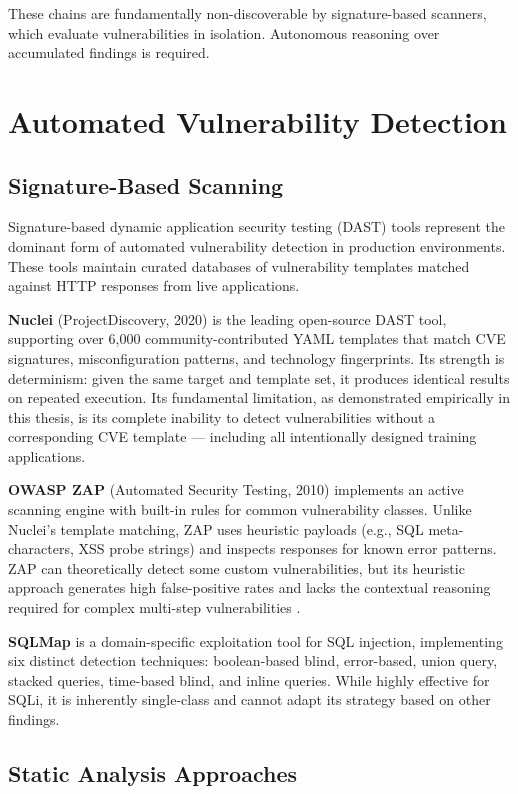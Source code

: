 \documentclass[12pt,a4paper,oneside,openany]{book}
\begin{document}
These chains are fundamentally non-discoverable by signature-based scanners, which evaluate vulnerabilities in isolation. Autonomous reasoning over accumulated findings is required.

\section{Automated Vulnerability Detection}

\subsection{Signature-Based Scanning}

Signature-based dynamic application security testing (DAST) tools represent the dominant form of automated vulnerability detection in production environments. These tools maintain curated databases of vulnerability templates matched against HTTP responses from live applications.

\textbf{Nuclei} (ProjectDiscovery, 2020) is the leading open-source DAST tool, supporting over 6,000 community-contributed YAML templates that match CVE signatures, misconfiguration patterns, and technology fingerprints. Its strength is determinism: given the same target and template set, it produces identical results on repeated execution. Its fundamental limitation, as demonstrated empirically in this thesis, is its complete inability to detect vulnerabilities without a corresponding CVE template — including all intentionally designed training applications.

\textbf{OWASP ZAP} (Automated Security Testing, 2010) implements an active scanning engine with built-in rules for common vulnerability classes. Unlike Nuclei's template matching, ZAP uses heuristic payloads (e.g., SQL meta-characters, XSS probe strings) and inspects responses for known error patterns. ZAP can theoretically detect some custom vulnerabilities, but its heuristic approach generates high false-positive rates and lacks the contextual reasoning required for complex multi-step vulnerabilities \cite{diaz2022evaluation}.

\textbf{SQLMap} is a domain-specific exploitation tool for SQL injection, implementing six distinct detection techniques: boolean-based blind, error-based, union query, stacked queries, time-based blind, and inline queries. While highly effective for SQLi, it is inherently single-class and cannot adapt its strategy based on other findings.

\subsection{Static Analysis Approaches}
\end{document}

